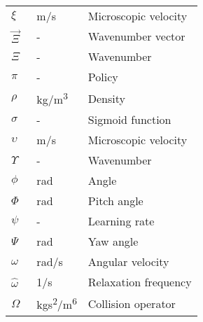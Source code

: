 \begin{longtable}{p{5cm}p{4cm}p{5cm}}
    $\xi$    		    & \SI{}{m/s}        & Microscopic velocity \\
   	$\vec{\Xi}$			& \SI{}{-}			& Wavenumber vector\\
 	$\Xi$				& \SI{}{-}			& Wavenumber\\
    $\pi$				& \SI{}{-}			& Policy \\
    $\rho$              & \SI{}{kg/m^3}     & Density \\
    $\sigma$			& \SI{}{-}			& Sigmoid function \\
    $\upsilon$			& \SI{}{m/s}		& Microscopic velocity \\
    $\Upsilon$			& \SI{}{-}			& Wavenumber \\
    $\phi$				& \SI{}{rad}		& Angle \\
    $\Phi$				& \SI{}{rad}		& Pitch angle \\
    $\psi$				& \SI{}{-}			& Learning rate \\
    $\Psi$				& \SI{}{rad}		& Yaw angle \\
    $\omega$			& \SI{}{rad/s}		& Angular velocity \\
    $\hat{\omega}$		& \SI{}{1/s}		& Relaxation frequency \\
    $\Omega$            & \SI{}{kgs^2/m^6}  & Collision operator \\
\end{longtable}

